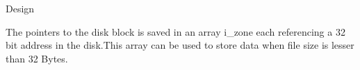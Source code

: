 \documentclass{beamer}
\begin{document}
%

\begin{frame}{Design}

The pointers to the disk block is saved in an array i\_zone each referencing a 32 bit address in the disk.This array can be used to store data when file size is lesser than 32 Bytes. 
\end{frame}








%
\end{document}
